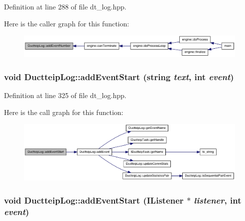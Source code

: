 Definition at line 288 of file dt\_\-log.hpp.

Here is the caller graph for this function:\nopagebreak
\begin{figure}[H]
\begin{center}
\leavevmode
\includegraphics[width=353pt]{class_ductteip_log_a0edeefb537663709b3d284e60ed51b96_icgraph}
\end{center}
\end{figure}
\hypertarget{class_ductteip_log_a0a24d89a29b40756975c3190f011b30f}{
\subsubsection[{addEventStart}]{\setlength{\rightskip}{0pt plus 5cm}void DuctteipLog::addEventStart (string {\em text}, \/  int {\em event})}}
\label{class_ductteip_log_a0a24d89a29b40756975c3190f011b30f}


Definition at line 325 of file dt\_\-log.hpp.

Here is the call graph for this function:\nopagebreak
\begin{figure}[H]
\begin{center}
\leavevmode
\includegraphics[width=371pt]{class_ductteip_log_a0a24d89a29b40756975c3190f011b30f_cgraph}
\end{center}
\end{figure}
\hypertarget{class_ductteip_log_aeb089df178933400cffbbf46a1352e69}{
\subsubsection[{addEventStart}]{\setlength{\rightskip}{0pt plus 5cm}void DuctteipLog::addEventStart ({\bf IListener} $\ast$ {\em listener}, \/  int {\em event})}}
\label{class_ductteip_log_aeb089df178933400cffbbf46a1352e69}


